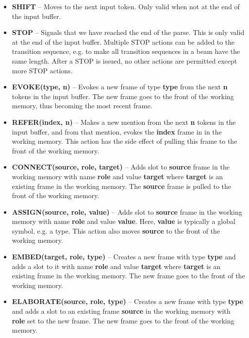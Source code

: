 \documentclass[11pt,a4paper]{article}
\begin{document}
\begin{itemize}
  \item {\bf SHIFT} -- Moves to the next input token. Only valid when not at the
        end of the input buffer.
  \item {\bf STOP} -- Signals that we have reached the end of the parse. This is
        only valid at the end of the input buffer. Multiple STOP actions
        can be added to the transition sequence, e.g. to make all transition sequences in a
        beam have the same length. After a STOP is issued, no other actions are
        permitted except more STOP actions.
  \item {\bf EVOKE(type, n)} -- Evokes a new frame of type {\bf type} from
        the next {\bf n} tokens in the input buffer. The new frame goes to the
        front of the working memory, thus becoming the most recent frame.
  \item {\bf REFER(index, n)} -- Makes a new mention from the next {\bf n} tokens
        in the input buffer, and from that mention, evokes the {\bf index} frame in
        in the working memory. This action has the side effect of pulling this frame
        to the front of the working memory.
  \item {\bf CONNECT(source, role, target)} -- Adds slot to {\bf source} frame
        in the working memory with name {\bf role} and value {\bf target}
        where {\bf target} is an existing frame in the working memory. The
        {\bf source} frame is pulled to the front of the working memory.
  \item {\bf ASSIGN(source, role, value)} -- Adds slot to {\bf source} frame in
        the working memory with name {\bf role} and value {\bf value}. Here,
        {\bf value} is typically a global symbol, e.g. a type. This action also
        moves {\bf source} to the front of the working memory.
  \item {\bf EMBED(target, role, type)} -- Creates a new frame with
        type {\bf type} and adds a slot to it with name {\bf role} and value
        {\bf target} where {\bf target} is an existing frame in the working memory.
	The new frame goes to the front of the working memory.
  \item {\bf ELABORATE(source, role, type)} -- Creates a new frame with type
        {\bf type} and adds a slot to an existing frame {\bf source} in the
        working memory with {\bf role} set to the new frame. The new frame
        goes to the front of the working memory.
\end{itemize}
\end{document}
